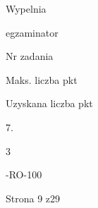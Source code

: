 \documentclass[a4paper,12pt]{article}
\begin{document}
Wypelnia

egzaminator

Nr zadania

Maks. liczba pkt

Uzyskana liczba pkt

7.

3

-RO-100

Strona 9 z29
\end{document}
